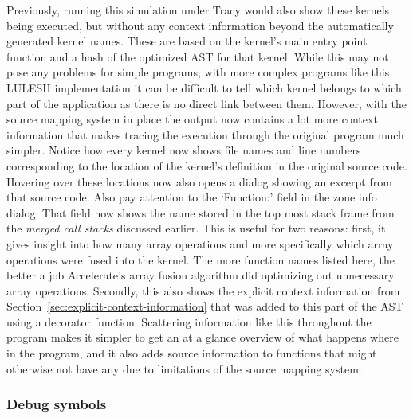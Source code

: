 \documentclass[fontsize=11pt,a4paper,parskip=half,numbers=noenddot]{scrartcl}
\begin{document}
Previously, running this simulation under Tracy would also show these kernels
being executed, but without any context information beyond the automatically
generated kernel names. These are based on the kernel's main entry point
function and a hash of the optimized AST for that kernel. While this may not
pose any problems for simple programs, with more complex programs like this
LULESH implementation it can be difficult to tell which kernel belongs to which
part of the application as there is no direct link between them. However, with
the source mapping system in place the output now contains a lot more context
information that makes tracing the execution through the original program much
simpler. Notice how every kernel now shows file names and line numbers
corresponding to the location of the kernel's definition in the original source
code. Hovering over these locations now also opens a dialog showing an excerpt
from that source code. Also pay attention to the `\textsf{Function:}' field in
the zone info dialog. That field now shows the name stored in the top most stack
frame from the \emph{merged call stacks} discussed earlier. This is useful for
two reasons: first, it gives insight into how many array operations and more
specifically which array operations were fused into the kernel. The more
function names listed here, the better a job Accelerate's array fusion algorithm
did optimizing out unnecessary array operations. Secondly, this also shows the
explicit context information from Section~\ref{sec:explicit-context-information}
that was added to this part of the AST using a decorator function. Scattering
information like this throughout the program makes it simpler to get an at a
glance overview of what happens where in the program, and it also adds source
information to functions that might otherwise not have any due to limitations of
the source mapping system.

\subsubsection{Debug symbols}

\end{document}
